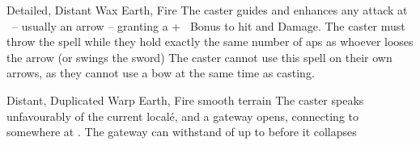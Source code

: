 \ifodd\value{diceNo}

  {Detailed, Distant}%
  {Wax}%
  {Earth, Fire}%
  {}%
  {The caster guides and enhances any attack at \spellRange\ -- usually an arrow -- granting a +~ Bonus to hit and Damage.
    The caster must throw the spell while they hold exactly the same number of \glspl{ap} as whoever looses the arrow (or swings the sword)}%
  {The caster cannot use this spell on their own arrows, as they cannot use a bow at the same time as casting.}

\else

  {Distant, Duplicated}%
  {Warp}%
  {Earth, Fire}%
  {smooth terrain}%
  {The caster speaks unfavourably of the current local\'e, and a gateway opens, connecting to somewhere at \spellRange.
  The gateway can withstand  of up to  before it collapses}%
  {}

\fi


